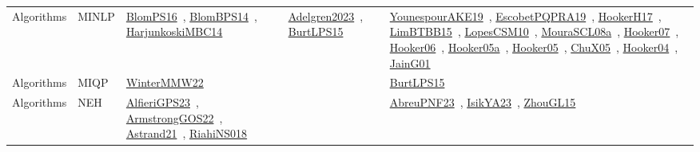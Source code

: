 {\begin{longtable}{lp{3cm}>{\raggedright\arraybackslash}p{6cm}>{\raggedright\arraybackslash}p{6cm}>{\raggedright\arraybackslash}p{8cm}}
Algorithms & MINLP & \href{../works/BlomPS16.pdf}{BlomPS16}~\cite{BlomPS16}, \href{../works/BlomBPS14.pdf}{BlomBPS14}~\cite{BlomBPS14}, \href{../works/HarjunkoskiMBC14.pdf}{HarjunkoskiMBC14}~\cite{HarjunkoskiMBC14} & \href{../works/Adelgren2023.pdf}{Adelgren2023}~\cite{Adelgren2023}, \href{../works/BurtLPS15.pdf}{BurtLPS15}~\cite{BurtLPS15} & \href{../works/YounespourAKE19.pdf}{YounespourAKE19}~\cite{YounespourAKE19}, \href{../works/EscobetPQPRA19.pdf}{EscobetPQPRA19}~\cite{EscobetPQPRA19}, \href{../works/HookerH17.pdf}{HookerH17}~\cite{HookerH17}, \href{../works/LimBTBB15.pdf}{LimBTBB15}~\cite{LimBTBB15}, \href{../works/LopesCSM10.pdf}{LopesCSM10}~\cite{LopesCSM10}, \href{../works/MouraSCL08a.pdf}{MouraSCL08a}~\cite{MouraSCL08a}, \href{../works/Hooker07.pdf}{Hooker07}~\cite{Hooker07}, \href{../works/Hooker06.pdf}{Hooker06}~\cite{Hooker06}, \href{../works/Hooker05a.pdf}{Hooker05a}~\cite{Hooker05a}, \href{../works/Hooker05.pdf}{Hooker05}~\cite{Hooker05}, \href{../works/ChuX05.pdf}{ChuX05}~\cite{ChuX05}, \href{../works/Hooker04.pdf}{Hooker04}~\cite{Hooker04}, \href{../works/JainG01.pdf}{JainG01}~\cite{JainG01}\\
Algorithms & MIQP & \href{../works/WinterMMW22.pdf}{WinterMMW22}~\cite{WinterMMW22} &  & \href{../works/BurtLPS15.pdf}{BurtLPS15}~\cite{BurtLPS15}\\
Algorithms & NEH & \href{../works/AlfieriGPS23.pdf}{AlfieriGPS23}~\cite{AlfieriGPS23}, \href{../works/ArmstrongGOS22.pdf}{ArmstrongGOS22}~\cite{ArmstrongGOS22}, \href{../works/Astrand21.pdf}{Astrand21}~\cite{Astrand21}, \href{../works/RiahiNS018.pdf}{RiahiNS018}~\cite{RiahiNS018} &  & \href{../works/AbreuPNF23.pdf}{AbreuPNF23}~\cite{AbreuPNF23}, \href{../works/IsikYA23.pdf}{IsikYA23}~\cite{IsikYA23}, \href{../works/ZhouGL15.pdf}{ZhouGL15}~\cite{ZhouGL15}\\

\end{longtable}}
